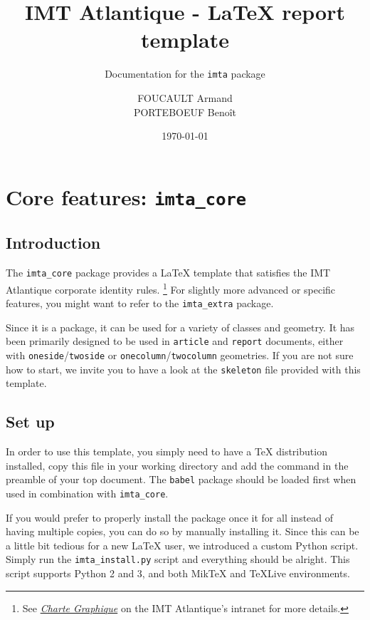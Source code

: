 \documentclass{report}
\author{FOUCAULT Armand\\PORTEBOEUF Benoît}
\date{\noexpand\today}
\title{IMT Atlantique - \LaTeX{} report template}
\subtitle{Documentation for the \texttt{imta} package}
\begin{document}
	
\imtaMaketitlepage

\tableofcontents

\newpage




\chapter{Core features: \texttt{imta\_core}}


\section{Introduction}
The \texttt{imta\_core} package provides a \LaTeX{} template that satisfies the IMT Atlantique corporate identity rules.
\footnote{See \textit{\href{https://intranet.imt-atlantique.fr/wp-content/uploads/2017/01/imt_atlantique_chartegraphique.pdf}{Charte Graphique}} on the IMT Atlantique's intranet for more details.} 
For slightly more advanced or specific features, you might want to refer to the \texttt{imta\_extra} package.

Since it is a package, it can be used for a variety of classes and geometry. 
It has been primarily designed to be used in \texttt{article} and \texttt{report} documents, either with \texttt{oneside}/\texttt{twoside} or \texttt{onecolumn}/\texttt{twocolumn} geometries. 
If you are not sure how to start, we invite you to have a look at the \texttt{skeleton} file provided with this template.


\section{Set up}
In order to use this template, you simply need to have a \TeX{} distribution installed, copy this file in your working directory and add the  command in the preamble of your top document. 
The \texttt{babel} package should be loaded first when used in combination with \texttt{imta\_core}.

If you would prefer to properly install the package once it for all instead of having multiple copies, you can do so by manually installing it. 
Since this can be a little bit tedious for a new \LaTeX{} user, we introduced a custom Python script. 
Simply run the \texttt{imta\_install.py} script and everything should be alright.
This script supports Python 2 and 3, and both Mik\TeX{} and \TeX{}Live environments. 
\end{document}
